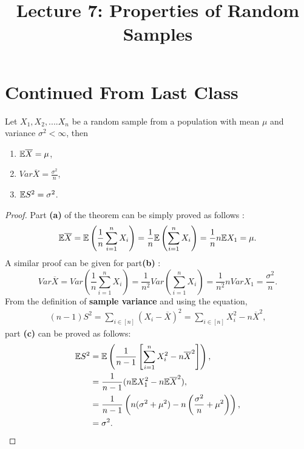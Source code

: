 \documentclass[a4paper,english,12pt]{article}
\title{ Lecture 7: Properties of Random Samples }
\author{}
\begin{document}
\maketitle

\section{Continued From Last Class}
\begin{thm}
Let $X_1,X_2,....X_n$ be a random sample from a population with mean $\mu$ and variance $\sigma^2<\infty$, then 
\renewcommand{\labelenumi}{\alph{enumi})}
\begin{enumerate}
\item $\mathbb{E} \overline{X}=\mu$,
\item $Var \overline{X}= \frac{\sigma^2}{n}$,
\item $\mathbb{E} S^2=\sigma^2$.
\end{enumerate}
\end{thm}
\begin{proof}
Part \textbf{(a)} of the theorem can be simply proved as follows :
\begin{equation}
\mathbb{E}\overline{X}=\mathbb{E}\left(\frac{1}{n}\sum_{i=1}^{n}X_i\right)=\frac{1}{n}\mathbb{E}\left(\sum_{i=1}^{n}X_i\right)=\frac{1}{n}n\mathbb{E} X_1=\mu.
\end{equation}
A similar proof can be given for part\textbf{(b)} :
\begin{equation}
Var\overline{X} =Var\left(\frac{1}{n}\sum_{i=1}^{n}X_i\right)=\frac{1}{n^2}Var\left(\sum_{i=1}^{n}X_i\right)=\frac{1}{n^2}nVarX_1=\frac{\sigma^2}{n}.
\end{equation}
From the definition of \textbf{sample variance} and using the equation, 
\begin{align}
(n-1)S^2=\sum_{i\in [n]}(X_i-\overline{X})^2=\sum_{i\in [n]}X_i^2-n\overline{X}^2,
\end{align}
part \textbf{(c)} can be proved as follows:
\begin{align}
\mathbb{E} S^2&=\mathbb{E} \left(\frac{1}{n-1}\left[\sum_{i=1}^{n}X_i^2-n\overline{X}^2\right]\right), \nonumber \\
&=\frac{1}{n-1}(n\mathbb{E} X_1^2-n\mathbb{E}\overline{X}^2), \nonumber \\
&=\frac{1}{n-1}\left(n(\sigma^2+\mu^2)-n\left(\frac{\sigma^2}{n}+\mu^2\right)\right), \nonumber\\
&=\sigma^2.
\end{align}
\end{proof}
\end{document}
